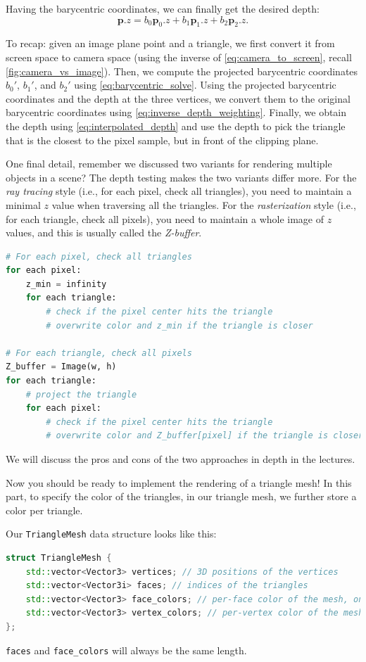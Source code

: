 Having the barycentric coordinates, we can finally get the desired depth:
\begin{equation}
\mathbf{p}.z = b_0 \mathbf{p}_0.z + b_1 \mathbf{p}_1.z + b_2 \mathbf{p}_2.z.
\label{eq:interpolated_depth}
\end{equation}

To recap: given an image plane point and a triangle, we first convert it from screen space to camera space (using the inverse of \cref{eq:camera_to_screen}, recall \cref{fig:camera_vs_image}). Then, we compute the projected barycentric coordinates $b_0'$, $b_1'$, and $b_2'$ using \cref{eq:barycentric_solve}. Using the projected barycentric coordinates and the depth at the three vertices, we convert them to the original barycentric coordinates using \cref{eq:inverse_depth_weighting}. Finally, we obtain the depth using \cref{eq:interpolated_depth} and use the depth to pick the triangle that is the closest to the pixel sample, but in front of the clipping plane.

One final detail, remember we discussed two variants for rendering multiple objects in a scene? The depth testing makes the two variants differ more. For the \emph{ray tracing} style (i.e., for each pixel, check all triangles), you need to maintain a minimal $z$ value when traversing all the triangles. For the \emph{rasterization} style (i.e., for each triangle, check all pixels), you need to maintain a whole image of $z$ values, and this is usually called the \emph{Z-buffer}. 
\begin{lstlisting}[language=Python]
# For each pixel, check all triangles
for each pixel:
    z_min = infinity
    for each triangle:
        # check if the pixel center hits the triangle
        # overwrite color and z_min if the triangle is closer

# For each triangle, check all pixels
Z_buffer = Image(w, h)
for each triangle:
    # project the triangle
    for each pixel:
        # check if the pixel center hits the triangle
        # overwrite color and Z_buffer[pixel] if the triangle is closer
\end{lstlisting}
We will discuss the pros and cons of the two approaches in depth in the lectures.

Now you should be ready to implement the rendering of a triangle mesh! In this part, to specify the color of the triangles, in our triangle mesh, we further store a color per triangle. 

Our \lstinline{TriangleMesh} data structure looks like this:
\begin{lstlisting}[language=C++]
struct TriangleMesh {
    std::vector<Vector3> vertices; // 3D positions of the vertices
    std::vector<Vector3i> faces; // indices of the triangles
    std::vector<Vector3> face_colors; // per-face color of the mesh, only used in HW 2.2
    std::vector<Vector3> vertex_colors; // per-vertex color of the mesh, used in HW 2.3 and later
};
\end{lstlisting}
\lstinline{faces} and \lstinline{face_colors} will always be the same length.


